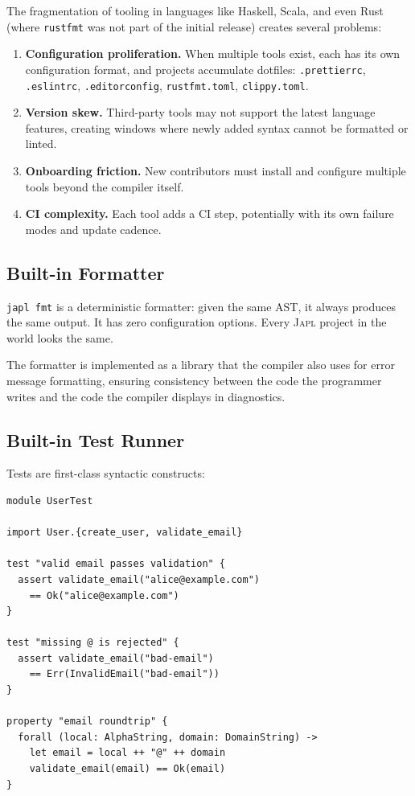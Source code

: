 \documentclass[11pt,twocolumn]{article}
\newcommand{\japl}{\textsc{Japl}}
\begin{document}
The fragmentation of tooling in languages like Haskell, Scala, and even Rust (where \texttt{rustfmt} was not part of the initial release) creates several problems:

\begin{enumerate}[leftmargin=*]
\item \textbf{Configuration proliferation.} When multiple tools exist, each has its own configuration format, and projects accumulate dotfiles: \texttt{.prettierrc}, \texttt{.eslintrc}, \texttt{.editorconfig}, \texttt{rustfmt.toml}, \texttt{clippy.toml}.
\item \textbf{Version skew.} Third-party tools may not support the latest language features, creating windows where newly added syntax cannot be formatted or linted.
\item \textbf{Onboarding friction.} New contributors must install and configure multiple tools beyond the compiler itself.
\item \textbf{CI complexity.} Each tool adds a CI step, potentially with its own failure modes and update cadence.
\end{enumerate}

\subsection{Built-in Formatter}

\texttt{japl fmt} is a deterministic formatter: given the same AST, it always produces the same output.
It has zero configuration options.
Every \japl{} project in the world looks the same.

The formatter is implemented as a library that the compiler also uses for error message formatting, ensuring consistency between the code the programmer writes and the code the compiler displays in diagnostics.

\subsection{Built-in Test Runner}

Tests are first-class syntactic constructs:

\begin{lstlisting}
module UserTest

import User.{create_user, validate_email}

test "valid email passes validation" {
  assert validate_email("alice@example.com")
    == Ok("alice@example.com")
}

test "missing @ is rejected" {
  assert validate_email("bad-email")
    == Err(InvalidEmail("bad-email"))
}

property "email roundtrip" {
  forall (local: AlphaString, domain: DomainString) ->
    let email = local ++ "@" ++ domain
    validate_email(email) == Ok(email)
}
\end{lstlisting}
\end{document}
